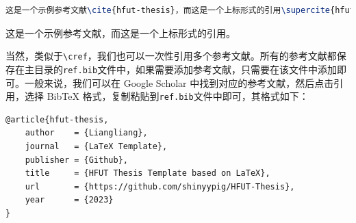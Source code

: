 \begin{lstlisting}[language=TeX]
这是一个示例参考文献\cite{hfut-thesis}，而这是一个上标形式的引用\supercite{hfut-thesis}。
\end{lstlisting}

这是一个示例参考文献\cite{hfut-thesis}，而这是一个上标形式的引用\supercite{hfut-thesis}。

当然，类似于\texttt{\textbackslash cref}，我们也可以一次性引用多个参考文献。所有的参考文献都保存在主目录的\texttt{ref.bib}文件中，如果需要添加参考文献，只需要在该文件中添加即可。一般来说，我们可以在 Google Scholar 中找到对应的参考文献，然后点击引用，选择 BibTeX 格式，复制粘贴到\texttt{ref.bib}文件中即可，其格式如下：

\begin{lstlisting}[language=TeX]
@article{hfut-thesis,
    author    = {Liangliang},
    journal   = {LaTeX Template},
    publisher = {Github},
    title     = {HFUT Thesis Template based on LaTeX},
    url       = {https://github.com/shinyypig/HFUT-Thesis},
    year      = {2023}
}
\end{lstlisting}
